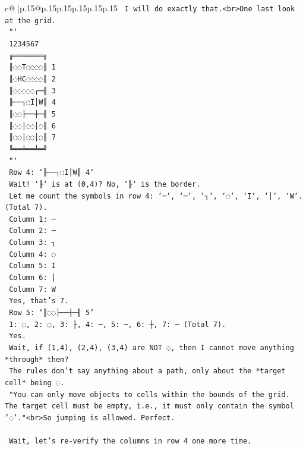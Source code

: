 \documentclass{article}
\begin{document}
{\begin{supertabular}{c@{$\;$}|p{.15\linewidth}@{}p{.15\linewidth}p{.15\linewidth}p{.15\linewidth}p{.15\linewidth}p{.15\linewidth}}
{{{\texttt{    I will do exactly that.<br>One last look at the grid.} \\
\texttt{    ```} \\
\texttt{     1234567} \\
\texttt{    ╔═══════╗} \\
\texttt{    ║◌◌T◌◌◌◌║ 1} \\
\texttt{    ║◌HC◌◌◌◌║ 2} \\
\texttt{    ║◌◌◌◌◌┌─╢ 3} \\
\texttt{    ╟──┐◌I│W║ 4} \\
\texttt{    ║◌◌├──┼─╢ 5} \\
\texttt{    ║◌◌│◌◌│◌║ 6} \\
\texttt{    ║◌◌│◌◌│◌║ 7} \\
\texttt{    ╚══╧══╧═╝} \\
\texttt{    ```} \\
\texttt{    Row 4: `╟──┐◌I│W║ 4`} \\
\texttt{    Wait! `╟` is at (0,4)? No, `╟` is the border.} \\
\texttt{    Let me count the symbols in row 4: `─`, `─`, `┐`, `◌`, `I`, `│`, `W`. (Total 7).} \\
\texttt{    Column 1: ─} \\
\texttt{    Column 2: ─} \\
\texttt{    Column 3: ┐} \\
\texttt{    Column 4: ◌} \\
\texttt{    Column 5: I} \\
\texttt{    Column 6: │} \\
\texttt{    Column 7: W} \\
\texttt{    Yes, that's 7.} \\
\texttt{    Row 5: `║◌◌├──┼─╢ 5`} \\
\texttt{    1: ◌, 2: ◌, 3: ├, 4: ─, 5: ─, 6: ┼, 7: ─ (Total 7).} \\
\texttt{    Yes.} \\
\texttt{    Wait, if (1,4), (2,4), (3,4) are NOT ◌, then I cannot move anything *through* them?} \\
\texttt{    The rules don't say anything about a path, only about the *target cell* being ◌.} \\
\texttt{    "You can only move objects to cells within the bounds of the grid. The target cell must be empty, i.e., it must only contain the symbol '◌'."<br>So jumping is allowed. Perfect.} \\
\\ 
\texttt{    Wait, let's re{-}verify the columns in row 4 one more time.} \\
}}}
\end{supertabular}}
\end{document}
